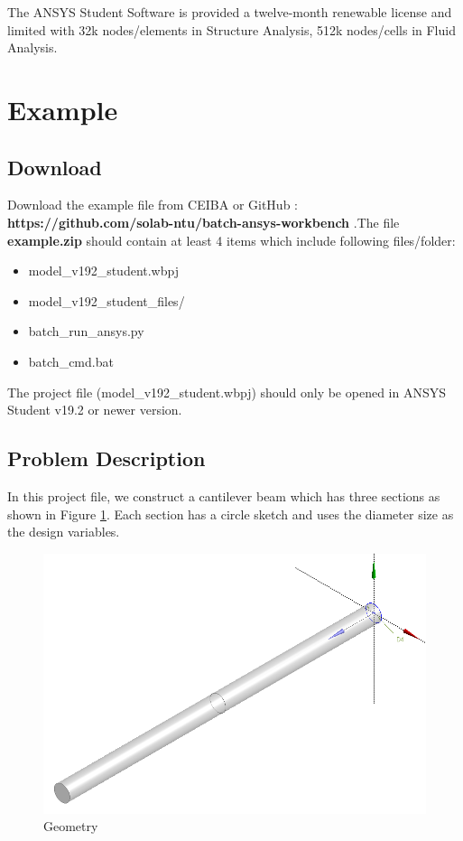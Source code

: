 \documentclass[12pt]{kjleehw}
\begin{document}
\begin{CJK}{UTF8}{bkai}
The ANSYS Student Software is provided a twelve-month renewable license and limited with 32k nodes/elements in Structure Analysis, 512k nodes/cells in Fluid Analysis.

\section{Example}

\subsection{Download}

Download the example file from CEIBA or GitHub :
\textbf{https://github.com/solab-ntu/batch-ansys-workbench} .The file \textbf{example.zip} should contain at least 4 items which include following files/folder:

\begin{itemize}
  \item model\_v192\_student.wbpj
  \item model\_v192\_student\_files/
  \item batch\_run\_ansys.py
  \item batch\_cmd.bat
\end{itemize}

The project file (model\_v192\_student.wbpj) should only be opened in ANSYS Student v19.2 or newer version.

\subsection{Problem Description}

In this project file, we construct a cantilever beam which has three sections as shown in Figure \ref{fig:cantilever}. Each section has a circle sketch and uses the diameter size as the design variables.\\

\begin{figure}[h]
	\centering
	\includegraphics[scale=0.4]{figure/cantilever.png}
	\caption{Geometry}
	\label{fig:cantilever}
\end{figure}


\end{CJK}
\end{document}
